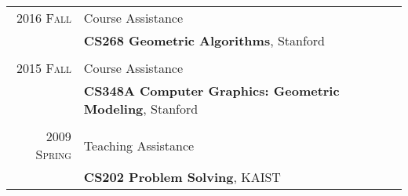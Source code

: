 \documentclass[letterpaper,10pt]{article} %
\newcommand{\blankline}{\quad\pagebreak[2]}
\begin{document}
{\begin{tabular}{r|p{11cm}}

\textsc{2016 Fall} & Course Assistance\\
& \textbf{CS268 Geometric Algorithms}, Stanford\\
& \\


\textsc{2015 Fall} & Course Assistance\\
& \textbf{CS348A Computer Graphics: Geometric Modeling}, Stanford\\
& \\


\textsc{2009 Spring} & Teaching Assistance\\
& \textbf{CS202 Problem Solving}, KAIST\\
\end{tabular}

\blankline


%
%


}
\end{document}
